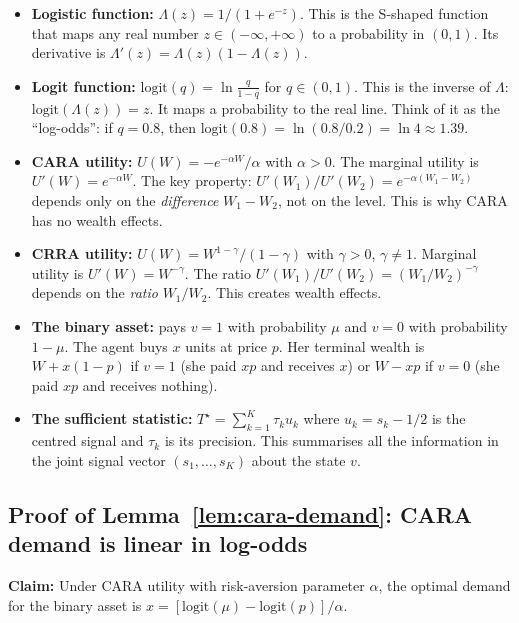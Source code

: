 \documentclass[12pt,letterpaper]{article}
\theoremstyle{definition}
\theoremstyle{remark}
\newcommand{\Lam}{\Lambda}            %
\newcommand{\logit}{\mathrm{logit}}
\newcommand{\Tstar}{T^{\!\star}}
\newcommand{\1}{\mathbf{1}}
\begin{document}
\begin{itemize}[topsep=4pt,itemsep=4pt]
\item \textbf{Logistic function:} $\Lam(z) = 1/(1+e^{-z})$.
This is the S-shaped function that maps any real number $z \in (-\infty,+\infty)$
to a probability in $(0,1)$. Its derivative is $\Lam'(z) = \Lam(z)(1-\Lam(z))$.

\item \textbf{Logit function:} $\logit(q) = \ln\tfrac{q}{1-q}$
for $q \in (0,1)$. This is the inverse of $\Lam$: $\logit(\Lam(z)) = z$.
It maps a probability to the real line. Think of it as the
``log-odds'': if $q = 0.8$, then
$\logit(0.8) = \ln(0.8/0.2) = \ln 4 \approx 1.39$.

\item \textbf{CARA utility:} $U(W) = -e^{-\alpha W}/\alpha$ with
$\alpha > 0$. The marginal utility is $U'(W) = e^{-\alpha W}$. The key
property: $U'(W_1)/U'(W_2) = e^{-\alpha(W_1 - W_2)}$ depends only on
the \emph{difference} $W_1 - W_2$, not on the level. This is why CARA
has no wealth effects.

\item \textbf{CRRA utility:} $U(W) = W^{1-\gamma}/(1-\gamma)$ with
$\gamma > 0$, $\gamma \neq 1$. Marginal utility is $U'(W) = W^{-\gamma}$.
The ratio $U'(W_1)/U'(W_2) = (W_1/W_2)^{-\gamma}$ depends on the
\emph{ratio} $W_1/W_2$. This creates wealth effects.

\item \textbf{The binary asset:} pays $v = 1$ with probability $\mu$ and
$v = 0$ with probability $1-\mu$. The agent buys $x$ units at price $p$.
Her terminal wealth is $W + x(1-p)$ if $v=1$ (she paid $xp$ and
receives $x$) or $W - xp$ if $v=0$ (she paid $xp$ and receives
nothing).

\item \textbf{The sufficient statistic:} $\Tstar = \sum_{k=1}^K \tau_k u_k$
where $u_k = s_k - 1/2$ is the centred signal and $\tau_k$ is its
precision. This summarises all the information in the joint signal
vector $(s_1,\ldots,s_K)$ about the state $v$.
\end{itemize}

\subsection*{Proof of Lemma~\ref{lem:cara-demand}: CARA demand is
linear in log-odds}

\textbf{Claim:} Under CARA utility with risk-aversion parameter
$\alpha$, the optimal demand for the binary asset is
$x = [\logit(\mu) - \logit(p)]/\alpha$.
\end{document}
